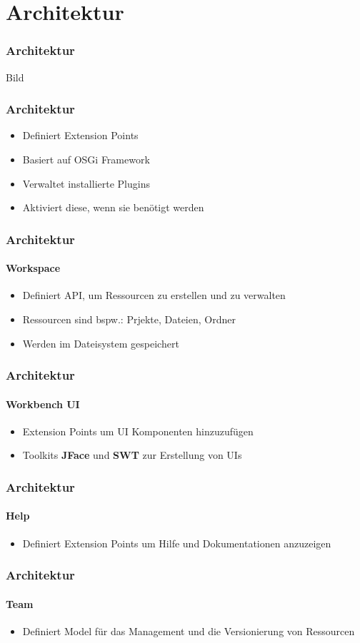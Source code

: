 {\section{Architektur}
\begin{frame}
  \frametitle{Architektur}
  Bild
\end{frame}

\begin{frame}
  \frametitle{Architektur}
  \begin{itemize}
    \item Definiert Extension Points
    \item Basiert auf OSGi Framework
    \item Verwaltet installierte Plugins
    \item Aktiviert diese, wenn sie benötigt werden
  \end{itemize}
\end{frame}

\begin{frame}
  \frametitle{Architektur}
  \framesubtitle{Workspace}
  \begin{itemize}
    \item Definiert API, um Ressourcen zu erstellen und zu verwalten
    \item Ressourcen sind bspw.: Prjekte, Dateien, Ordner
    \item Werden im Dateisystem gespeichert
  \end{itemize}
\end{frame}

\begin{frame}
  \frametitle{Architektur}
  \framesubtitle{Workbench UI}
  \begin{itemize}
    \item Extension Points um UI Komponenten hinzuzufügen
    \item Toolkits \textbf{JFace} und \textbf{SWT} zur Erstellung von UIs
  \end{itemize}
\end{frame}

\begin{frame}
  \frametitle{Architektur}
  \framesubtitle{Help}
  \begin{itemize}
    \item Definiert Extension Points um Hilfe und Dokumentationen anzuzeigen
  \end{itemize}
\end{frame}

\begin{frame}
  \frametitle{Architektur}
  \framesubtitle{Team}
  \begin{itemize}
    \item Definiert Model für das Management und die Versionierung von Ressourcen
  \end{itemize}
\end{frame}

}
